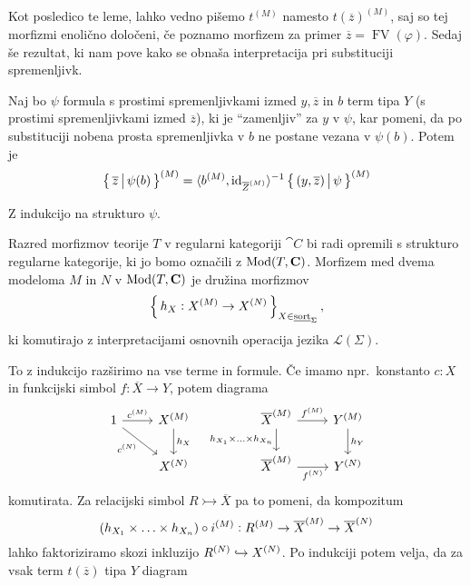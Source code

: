 \documentclass[../kategoricna_logika.tex]{subfiles}
\begin{document}
\noindent
Kot posledico te leme, lahko vedno pišemo $t^{(M)}$ namesto $t(\overline{z})^{(M)}$,
saj so tej morfizmi enolično določeni,
če poznamo morfizem za primer $\overline{z} = \operatorname{FV}(\varphi)$.
Sedaj še rezultat, ki nam pove kako se obnaša interpretacija pri substituciji spremenljivk.
\begin{lema}
  Naj bo $\psi$ formula s prostimi spremenljivkami izmed $y, \overline{z}$ in $b$ term tipa $Y$ (s prostimi spremenljivkami izmed $\overline{z}$), 
  ki je ``zamenljiv'' za $y$ v $\psi$, kar pomeni, da po substituciji nobena prosta spremenljivka v $b$ ne postane vezana v $\psi(b)$.
  Potem je 
  $$\set{\overline{z} \,\middle|\, \psi(b)}^{(M)} = \langle b^{(M)}, \mathrm{id}_{\interp{\overline{Z}}}\rangle^{-1} \set{(y, \overline{z}) \,\middle|\, \psi}^{(M)}$$
\end{lema}
\begin{dokaz}
  Z indukcijo na strukturo $\psi$.
\end{dokaz}
\begin{definicija}
Razred morfizmov teorije $T$ v regularni kategoriji $\cat{C}$ bi radi opremili s strukturo regularne kategorije,
ki jo bomo označili z $\Mod(T, \cat{C})$. Morfizem med dvema modeloma $M$ in $N$ v $\Mod(T, \cat{C})$ je družina morfizmov
$$\set{h_X : \interp{X} \to \interp[N]{X}}_{X \in \underline{\mathrm{sort}}_\Sigma},$$
ki komutirajo z interpretacijami osnovnih operacija jezika $\mathcal{L}(\Sigma)$.
\end{definicija}
To z indukcijo razširimo na vse terme in formule. Če imamo npr.\ konstanto $c:X$ in funkcijski simbol $f:\overline{X} \to Y$,
potem diagrama
\begin{equation*}
  \begin{tikzcd}
    1 \ar[dr, "c^{(N)}"'] \ar[r, "\interp{c}"] & \interp{X} \ar[d, "h_X"]  &&  \interp{\overline{X}} \ar[d, "h_{X_1} \times \ldots \times h_{X_n}"'] \ar[r, "\interp{f}"] & \interp{Y} \ar[d, "h_Y"]\\
    & \interp[N]{X} && \interp{\overline{X}} \ar[r, "{\interp[N]{f}}"'] & \interp[N]{Y}
  \end{tikzcd}
\end{equation*}
komutirata. Za relacijski simbol $R \rightarrowtail \overline{X}$ pa to pomeni, da kompozitum
$$(h_{X_1} \times \ldots \times h_{X_n}) \circ \interp{i} : \interp{R} \to \interp{\overline{X}} \to \interp[N]{\overline{X}}$$
lahko faktoriziramo skozi inkluzijo $\interp[N]{R} \hookrightarrow \interp[N]{X}$.
Po indukciji potem velja, da za vsak term $t(\overline{z})$ tipa $Y$ diagram
\end{document}
